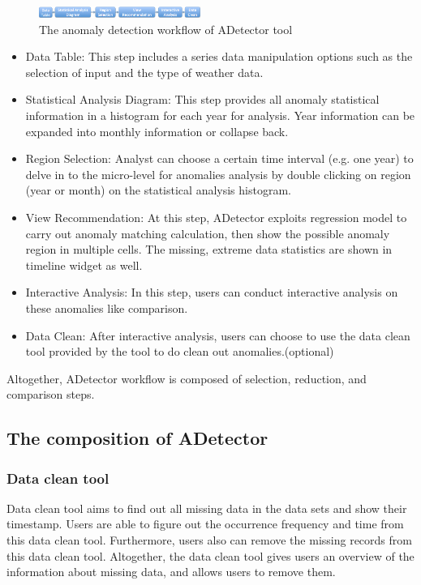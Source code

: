 \documentclass{vgtc}                          %
\begin{document}
\begin{figure}[htb]
	\centering
	\includegraphics[width=0.47\textwidth]{workflow.png}
	\caption{The anomaly detection workflow of ADetector tool}
\end{figure}

\begin{itemize}
	\item Data Table: This step includes a series data manipulation options such as the selection of input and the type of weather data. 
	\item Statistical Analysis Diagram: This step provides all anomaly statistical information in a histogram for each year for analysis. Year information can be expanded into monthly information or collapse back.
	\item Region Selection: Analyst can choose a certain time interval (e.g. one year) to delve in to the micro-level for anomalies analysis by double clicking on region (year or month) on the statistical analysis histogram.
	\item View Recommendation: At this step, ADetector exploits regression model to carry out anomaly matching calculation, then show the possible anomaly region in multiple cells. The missing, extreme data statistics are shown in timeline widget as well.
	\item Interactive Analysis: In this step, users can conduct interactive analysis on these anomalies like comparison.
	\item Data Clean: After interactive analysis, users can choose to use the data clean tool provided by the tool to do clean out anomalies.(optional)
\end{itemize}
Altogether, ADetector workflow is composed of selection, reduction, and comparison steps.

\subsection{The composition of ADetector}
\subsubsection{Data clean tool}

Data clean tool aims to find out all missing data in the data sets and show their timestamp. Users are able to figure out the occurrence frequency and time from this data clean tool. Furthermore, users also can remove the missing records from this data clean tool. Altogether, the data clean tool gives users an overview of the information about missing data, and allows users to remove them. 
\end{document}
